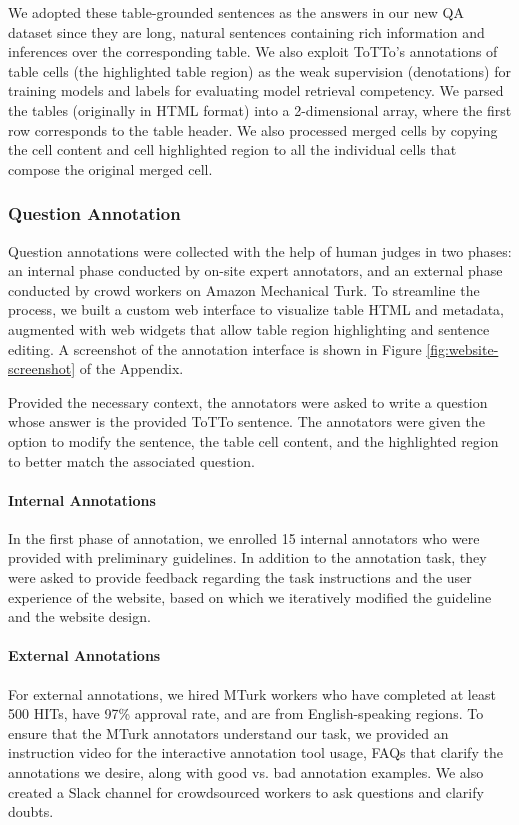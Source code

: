 \documentclass[11pt,a4paper]{article}
\begin{document}
We adopted these table-grounded sentences as the answers in our new QA dataset since they are long, natural sentences containing rich information and inferences over the corresponding table. We also exploit ToTTo's annotations of table cells (the highlighted table region) as the 
weak supervision (denotations) 
for training models and labels for evaluating model retrieval competency. We parsed the tables (originally in HTML format) into a 2-dimensional array, where the first row corresponds to the table header. We also processed merged cells by copying the cell content and cell highlighted region to all the individual cells that compose the original merged cell.


\subsubsection{Question Annotation}
Question annotations were collected with the help of human judges in two phases: an internal phase conducted by on-site expert annotators, and an external phase conducted by crowd workers on Amazon Mechanical Turk. To streamline the process, we built a custom web interface to visualize table HTML and metadata, augmented with web widgets that allow table region highlighting and sentence editing. A screenshot of the annotation interface is shown in Figure \ref{fig:website-screenshot} of the Appendix.

Provided the necessary context, the annotators were asked to write a question 
whose answer is the provided ToTTo sentence.
The annotators were given the option to modify the sentence, the table cell content, and the highlighted region to better match the associated question. 
\paragraph{Internal Annotations}
In the first phase of annotation, we enrolled 15 internal annotators who were provided with preliminary guidelines. In addition to the annotation task, they were asked to provide feedback regarding the task instructions and the user experience of the website, based on which we iteratively modified the guideline and the website design.

\paragraph{External Annotations}
For external annotations, we hired MTurk workers who have completed at least 500 HITs, have 97\% approval rate, and are from English-speaking regions. To ensure that the MTurk annotators understand our task, we provided an instruction video for the interactive annotation tool usage, FAQs that clarify the annotations we desire, along with good vs. bad annotation examples. 
We also created a Slack channel for crowdsourced workers to ask questions and clarify doubts. 
\end{document}
